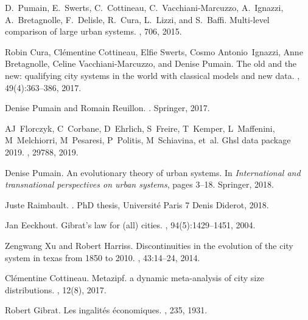 \documentclass[11pt]{article}
\begin{document}
%
%

\begin{thebibliography}{10}

D.~Pumain, E.~Swerts, C.~Cottineau, C.~Vacchiani-Marcuzzo, A.~Ignazzi,
  A.~Bretagnolle, F.~Delisle, R.~Cura, L.~Lizzi, and S.~Baffi.
\newblock Multi-level comparison of large urban systems.
, 706, 2015.

Robin Cura, Cl{\'e}mentine Cottineau, Elfie Swerts, Cosmo Antonio~Ignazzi, Anne
  Bretagnolle, Celine Vacchiani-Marcuzzo, and Denise Pumain.
\newblock The old and the new: qualifying city systems in the world with
  classical models and new data.
, 49(4):363--386, 2017.

Denise Pumain and Romain Reuillon.
.
\newblock Springer, 2017.

AJ~Florczyk, C~Corbane, D~Ehrlich, S~Freire, T~Kemper, L~Maffenini,
  M~Melchiorri, M~Pesaresi, P~Politis, M~Schiavina, et~al.
\newblock Ghsl data package 2019.
, 29788, 2019.

Denise Pumain.
\newblock An evolutionary theory of urban systems.
\newblock In {\em International and transnational perspectives on urban
  systems}, pages 3--18. Springer, 2018.

Juste Raimbault.
.
\newblock PhD thesis, Universit{\'e} Paris 7 Denis Diderot, 2018.

Jan Eeckhout.
\newblock Gibrat's law for (all) cities.
, 94(5):1429--1451, 2004.

Zengwang Xu and Robert Harriss.
\newblock Discontinuities in the evolution of the city system in texas from
  1850 to 2010.
, 43:14--24, 2014.

Cl{\'e}mentine Cottineau.
\newblock Metazipf. a dynamic meta-analysis of city size distributions.
, 12(8), 2017.

Robert Gibrat.
\newblock Les ingalit{\'e}s {\'e}conomiques.
, 235, 1931.


\end{thebibliography}
\end{document}
